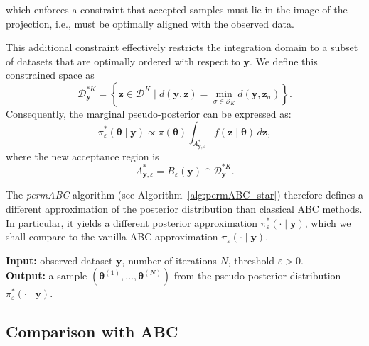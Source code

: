 \documentclass[11pt,a4paper]{article}
\def\dataspace{\mathcal{D}}
\def\obsdata{\mathbf{y}}
\def\param{\boldsymbol{\theta}}
\def\parprop{\boldsymbol{\theta}}
\def\simdata{\mathbf{z}}
\def\eps{\varepsilon}
\DeclareMathOperator*{\argmin}{arg\,min}
\theoremstyle{plain}
\theoremstyle{definition}
\theoremstyle{remark}
\begin{document}
\noindent which enforces a constraint that accepted samples must lie in the image of the projection, i.e., must be optimally aligned with the observed data.

This additional constraint effectively restricts the integration domain to a subset of datasets that are optimally ordered with respect to \( \obsdata \). We define this constrained space as
\[
\dataspace_{\obsdata}^{*K} = \left\{ \simdata \in \dataspace^K \mid d(\obsdata, \simdata) = \min_{\sigma \in \mathcal{S}_K} d(\obsdata, \simdata_{\sigma}) \right\}.
\]
Consequently, the marginal pseudo-posterior can be expressed as:
\begin{equation}
\label{eqpermabc_star}
\pi_{\varepsilon}^*(\param \mid \obsdata) \propto \pi(\param) \int_{A_{\obsdata,\varepsilon}^*} f(\simdata \mid \param) \, d\simdata,
\end{equation}
where the new acceptance region is 
\[
A_{\obsdata,\varepsilon}^* = B_{\varepsilon}(\obsdata) \cap \dataspace_{\obsdata}^{*K}.
\]

The \emph{permABC} algorithm (see Algorithm~\ref{alg:permABC_star}) therefore defines a different approximation of the posterior distribution than classical ABC methods. In particular, it yields a different posterior approximation  \( \pi_{\varepsilon}^*(\cdot \mid \obsdata) \), which we shall compare to the vanilla ABC approximation \( \pi_{\varepsilon}(\cdot \mid \obsdata) \).

\begin{algorithm}[ht]
\caption{permABC Vanilla}
\label{alg:permABC_star}
\textbf{Input: }observed dataset $\obsdata$, number of iterations $N$, threshold $\varepsilon>0$.\\
\textbf{Output: }a sample $(\param^{(1)}, \dots, \param^{(N)})$ from the pseudo-posterior distribution $\pi_{\varepsilon}^*(\cdot\mid \obsdata)$.\\

\BlankLine

\For{$i = 1,\dots, N$}{
    \Repeat{$d(\obsdata, \simdata_{\sigma^*}) \leq \eps$}{
        $\parprop \sim \pi(\cdot)$\;
        $\simdata \sim f(\cdot \mid \parprop)$\;
        $\sigma^* = \argmin_{\sigma \in \mathcal{S}_K} d(\obsdata, \simdata_{\sigma})$\;
    }
    $\param^{(i)} = \param'_{\sigma^*}\;$
}
\end{algorithm}

\subsection{Comparison with ABC}
\label{sec:comparison}
\end{document}
